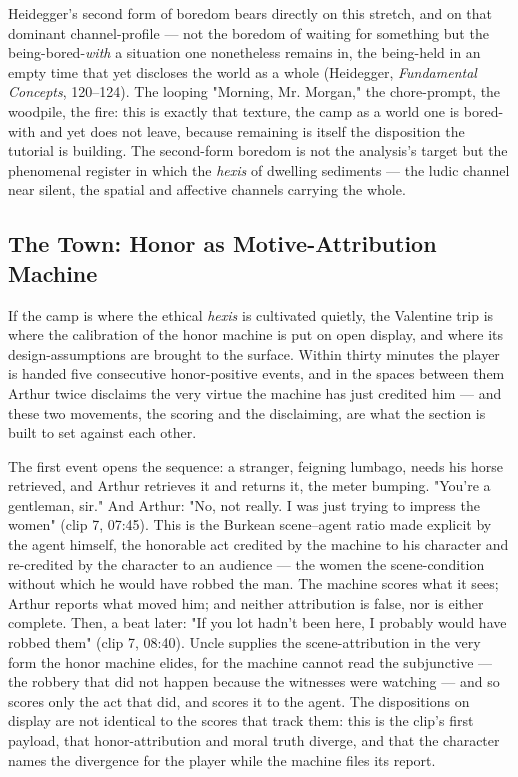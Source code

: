 \documentclass{article}
\begin{document}
Heidegger's second form of boredom bears directly on this stretch, and on that dominant channel-profile — not the boredom of waiting for something but the being-bored-\textit{with} a situation one nonetheless remains in, the being-held in an empty time that yet discloses the world as a whole (Heidegger, \textit{Fundamental Concepts}, 120–124). The looping "Morning, Mr. Morgan," the chore-prompt, the woodpile, the fire: this is exactly that texture, the camp as a world one is bored-with and yet does not leave, because remaining is itself the disposition the tutorial is building. The second-form boredom is not the analysis's target but the phenomenal register in which the \textit{hexis} of dwelling sediments — the ludic channel near silent, the spatial and affective channels carrying the whole.

\bigskip

\subsection*{The Town: Honor as Motive-Attribution Machine}

If the camp is where the ethical \textit{hexis} is cultivated quietly, the Valentine trip is where the calibration of the honor machine is put on open display, and where its design-assumptions are brought to the surface. Within thirty minutes the player is handed five consecutive honor-positive events, and in the spaces between them Arthur twice disclaims the very virtue the machine has just credited him — and these two movements, the scoring and the disclaiming, are what the section is built to set against each other.

The first event opens the sequence: a stranger, feigning lumbago, needs his horse retrieved, and Arthur retrieves it and returns it, the meter bumping. "You're a gentleman, sir." And Arthur: "No, not really. I was just trying to impress the women" (clip 7, 07:45). This is the Burkean scene–agent ratio made explicit by the agent himself, the honorable act credited by the machine to his character and re-credited by the character to an audience — the women the scene-condition without which he would have robbed the man. The machine scores what it sees; Arthur reports what moved him; and neither attribution is false, nor is either complete. Then, a beat later: "If you lot hadn't been here, I probably would have robbed them" (clip 7, 08:40). Uncle supplies the scene-attribution in the very form the honor machine elides, for the machine cannot read the subjunctive — the robbery that did not happen because the witnesses were watching — and so scores only the act that did, and scores it to the agent. The dispositions on display are not identical to the scores that track them: this is the clip's first payload, that honor-attribution and moral truth diverge, and that the character names the divergence for the player while the machine files its report.
\end{document}
